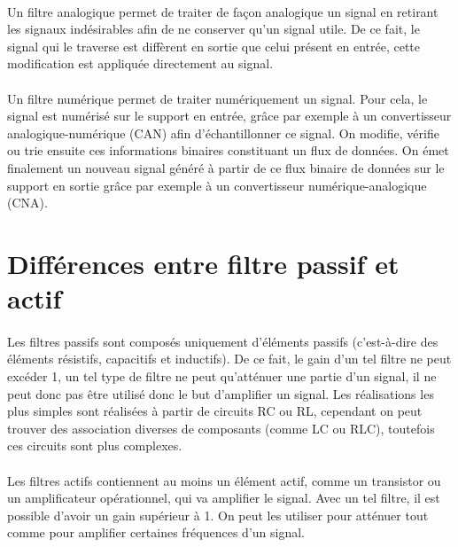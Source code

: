 \documentclass[a4paper,11pt]{article}
\begin{document}
    \paragraph{}
Un filtre analogique permet de traiter de façon analogique un signal en retirant les signaux indésirables afin de ne conserver qu’un signal utile.
De ce fait, le signal qui le traverse est diffèrent en sortie que celui présent en entrée, cette modification est appliquée directement au signal.
    \paragraph{}
Un filtre numérique permet de traiter numériquement un signal.
Pour cela, le signal est numérisé sur le support en entrée, grâce par exemple à un convertisseur analogique-numérique (CAN) afin d’échantillonner ce signal.
On modifie, vérifie ou trie ensuite ces informations binaires constituant un flux de données.
On émet finalement un nouveau signal généré à partir de ce flux binaire de données sur le support en sortie grâce par exemple à un convertisseur numérique-analogique (CNA).

    \clearpage


\section{Différences entre filtre passif et actif}
    \paragraph{}
Les filtres passifs sont composés uniquement d’éléments passifs (c’est-à-dire des éléments résistifs, capacitifs et inductifs).
De ce fait, le gain d’un tel filtre ne peut excéder 1, un tel type de filtre ne peut qu’atténuer une partie d’un signal, il ne peut donc pas être utilisé donc le but d’amplifier un signal.
Les réalisations les plus simples sont réalisées à partir de circuits RC ou RL, cependant on peut trouver des association diverses de composants (comme LC ou RLC), toutefois ces circuits sont plus complexes.
    \paragraph{}
Les filtres actifs contiennent au moins un élément actif, comme un transistor ou un amplificateur opérationnel, qui va amplifier le signal.
Avec un tel filtre, il est possible d’avoir un gain supérieur à 1.
On peut les utiliser pour atténuer tout comme pour amplifier certaines fréquences d’un signal.
\end{document}

